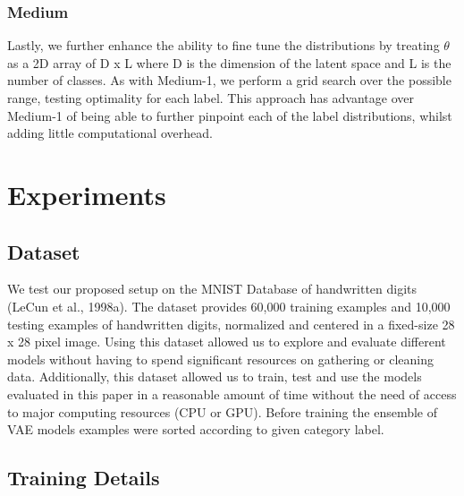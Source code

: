 \documentclass{article}
\begin{document}
\subsubsection{Medium}
Lastly, we further enhance the ability to fine tune the distributions by treating $\theta$ as a 2D array of D x L where D is the dimension of the latent space and L is the number of classes. As with Medium-1, we perform a grid search over the possible range, testing optimality for each label. This approach has advantage over Medium-1 of being able to further pinpoint each of the label distributions, whilst adding little computational overhead.
\section{Experiments}
\subsection{Dataset}

We test our proposed setup on the MNIST Database of handwritten digits (LeCun et al., 1998a). The dataset provides 60,000 training examples and 10,000 testing examples of handwritten digits, normalized and centered in a fixed-size 28 x 28 pixel image. Using this dataset allowed us to explore and evaluate different models without having to spend significant resources on gathering or cleaning data. Additionally, this dataset allowed us to train, test and use the models evaluated in this paper in a reasonable amount of time without the need of access to major computing resources (CPU or GPU). Before training the ensemble of VAE models examples were sorted according to given category label.

\subsection{Training Details}
\end{document}
